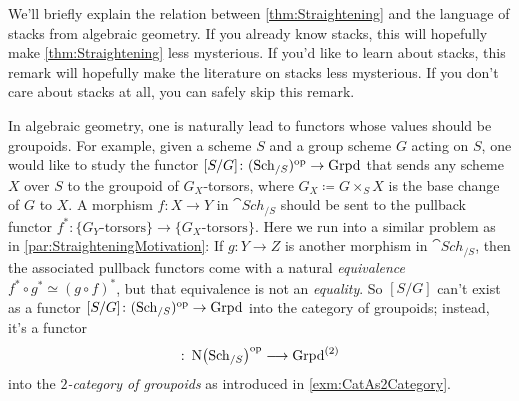 \begin{numpar}\label{par:Stacks}
	We'll briefly explain the relation between \cref{thm:Straightening} and the language of stacks from algebraic geometry. If you already know stacks, this will hopefully make \cref{thm:Straightening} less mysterious. If you'd like to learn about stacks, this remark will hopefully make the literature on stacks less mysterious. If you don't care about stacks at all, you can safely skip this remark.
	
	In algebraic geometry, one is naturally lead to functors whose values should be groupoids. For example, given a scheme $S$ and a group scheme $G$ acting on $S$, one would like to study the functor $[S/G]\colon (\mathrm{Sch}_{/S})^{\mathrm{op}}\rightarrow \mathrm{Grpd}$ that sends any scheme $X$ over $S$ to the groupoid of $G_X$-torsors, where $G_X\coloneqq G\times_SX$ is the base change of $G$ to $X$. A morphism $f\colon X\rightarrow Y$ in $\cat{Sch}_{/S}$ should be sent to the pullback functor $f^*\colon \{G_Y\text{-torsors}\}\rightarrow \{G_X\text{-torsors}\}$. Here we run into a similar problem as in \cref{par:StraighteningMotivation}: If $g\colon Y\rightarrow Z$ is another morphism in $\cat{Sch}_{/S}$, then the associated pullback functors come with a natural \emph{equivalence} $f^*\circ g^*\simeq (g\circ f)^*$, but that equivalence is not an \emph{equality}. So $[S/G]$ can't exist as a functor $[S/G]\colon (\mathrm{Sch}_{/S})^{\mathrm{op}}\rightarrow \mathrm{Grpd}$ into the category of groupoids; instead, it's a functor
	\begin{equation*}
		[S/G]\colon \N\left(\cat{Sch}_{/S}\right)^\op\longrightarrow \cat{Grpd}^{(2)}
	\end{equation*}
	into the \emph{$2$-category of groupoids} as introduced in \cref{exm:CatAs2Category}.
	

\end{numpar}

